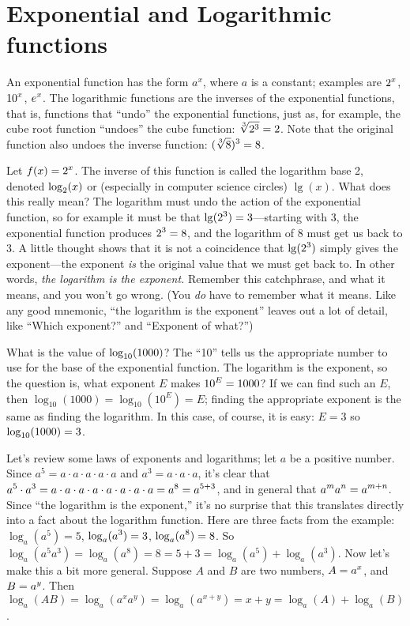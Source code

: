 \section{Exponential and Logarithmic functions}{}{}
\nobreak
An exponential function has the form
$a^x$, where $a$ is a constant; examples are $\displaystyle 2^x$, $\displaystyle 10^x$, $\displaystyle e^x$. The
logarithmic functions are
the {\dfont inverses\/} of the exponential
functions, that is, functions that ``undo'' the exponential functions,
just as, for example, the cube root function ``undoes'' the cube
function: $\ds \root3\of{2^3}=2$. Note that the original function also
undoes the inverse function: $\ds (\root3\of{8})^3=8$.

Let $\displaystyle f(x)=2^x$. The inverse of this function is called the
logarithm base 2, denoted $\displaystyle \log_2(x)$ or (especially in computer
science circles) $\lg(x)$. What does this really mean? The logarithm
must undo the action of the exponential function, so for example it
must be that $\displaystyle \lg(2^3)=3$---starting with 3, the exponential function
produces $\displaystyle 2^3=8$, and the logarithm of 8 must get us back to 3. A
little thought shows that it is not a coincidence that $\displaystyle \lg(2^3)$
simply gives the exponent---the exponent {\it is\/} the original value
that we must get back to. In other words, {\it the logarithm is the
  exponent.} Remember this catchphrase, and what it means, and you
won't go wrong. (You {\it do\/} have to remember what it means. Like
any good mnemonic, ``the logarithm is the exponent'' leaves out a lot
of detail, like ``Which exponent?'' and ``Exponent of what?'')

\begin{example}
What is the value of $\displaystyle \log_{10}(1000)$? The ``10'' tells us the
appropriate number to use for the base of the exponential
function. The logarithm is the exponent, so the question is, what
exponent $E$ makes $\displaystyle 10^E=1000$? If we can find such an $E$, then
$\log_{10}(1000)=\log_{10}(10^E)=E$; finding the appropriate exponent
is the same as finding the logarithm. In this case, of course, it is
easy: $E=3$ so $\displaystyle \log_{10}(1000)=3$.
\end{example}

Let's review some laws of exponents and logarithms; let $a$ be a
positive number. Since 
$a^5=a\cdot a\cdot a\cdot a\cdot a$ and 
$a^3=a\cdot a\cdot a$, it's clear that $\displaystyle a^5\cdot a^3 =
a\cdot a\cdot a\cdot a\cdot a\cdot a\cdot a\cdot a = a^8 = a^{5+3}$,
and in general that $\displaystyle a^ma^n=a^{m+n}$. Since ``the logarithm is the
exponent,'' it's no surprise that this translates directly into a fact
about the logarithm function. Here are three facts from the example:
$\log_a(a^5)=5$, $\displaystyle \log_a(a^3)=3$, $\displaystyle \log_a(a^8)=8$. So
$\log_a(a^5a^3)=\log_a(a^8)=8 = 5+3=\log_a(a^5)+\log_a(a^3)$. Now
let's make this a bit more general. Suppose $A$ and $B$ are two
numbers, $\displaystyle A=a^x$, and $\displaystyle B=a^y$. Then
$\log_a(AB)=\log_a(a^xa^y)=\log_a(a^{x+y})=x+y=\log_a(A)+\log_a(B)$.

